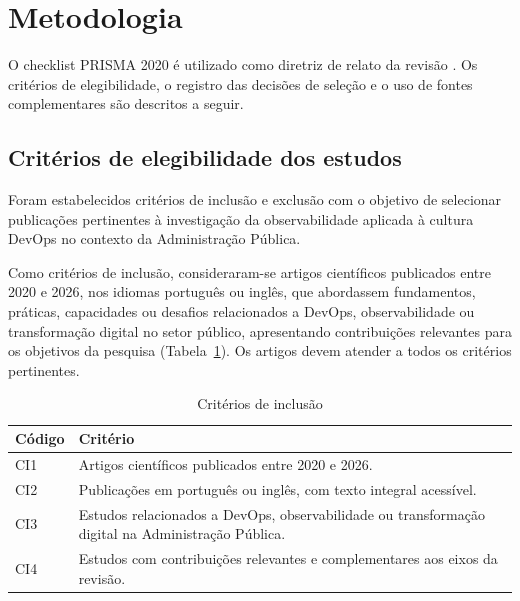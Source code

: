 \section{Metodologia}\label{sec:metodologia}

O checklist PRISMA 2020 é utilizado como diretriz de relato da revisão
\cite{page2021prisma}. Os critérios de elegibilidade, o registro das
decisões de seleção e o uso de fontes complementares são descritos a seguir.

\subsection{Critérios de elegibilidade dos estudos}\label{sec:criterios}

Foram estabelecidos critérios de inclusão e exclusão com o objetivo de
selecionar publicações pertinentes à investigação da observabilidade
aplicada à cultura DevOps no contexto da Administração Pública.

Como critérios de inclusão, consideraram-se artigos científicos publicados
entre 2020 e 2026, nos idiomas português ou inglês, que abordassem
fundamentos, práticas, capacidades ou desafios relacionados a DevOps,
observabilidade ou transformação digital no setor público, apresentando
contribuições relevantes para os objetivos da pesquisa
(Tabela~\ref{tab:inclusao}). Os artigos devem atender a todos os critérios
pertinentes.

\begin{table}[htbp]
\centering
\caption{Critérios de inclusão}\label{tab:inclusao}
\footnotesize
\begin{tabularx}{\linewidth}{@{}lX@{}}
\toprule
\textbf{Código} & \textbf{Critério} \\
\midrule
CI1 & Artigos científicos publicados entre 2020 e 2026. \\
CI2 & Publicações em português ou inglês, com texto integral acessível. \\
CI3 & Estudos relacionados a DevOps, observabilidade ou transformação digital
      na Administração Pública. \\
CI4 & Estudos com contribuições relevantes e complementares aos eixos da
      revisão. \\
\bottomrule
\end{tabularx}
\end{table}

